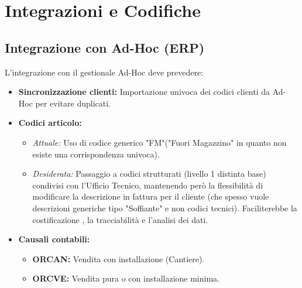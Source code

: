 \documentclass[12pt, a4paper]{article} %
\begin{document}
\section{Integrazioni e Codifiche}

\subsection{Integrazione con Ad-Hoc (ERP)}
L'integrazione con il gestionale Ad-Hoc deve prevedere:
\begin{itemize}
      \item \textbf{Sincronizzazione clienti:} Importazione univoca dei codici clienti da Ad-Hoc per evitare duplicati.
      \item \textbf{Codici articolo:}
            \begin{itemize}
                  \item \textit{Attuale:} Uso di codice generico "FM"("Fuori Magazzino" in quanto non esiste una corrispondenza univoca).
                  \item \textit{Desiderata:} Passaggio a codici strutturati (livello 1 distinta base) condivisi con l'Ufficio Tecnico, mantenendo però la flessibilità di modificare la descrizione in fattura per il cliente
                        (che spesso vuole descrizioni generiche tipo "Soffiante" e non codici tecnici). Faciliterebbe la costificazione , la tracciabilità e l'analisi dei dati.
            \end{itemize}
      \item \textbf{Causali contabili:}
            \begin{itemize}
                  \item \textbf{ORCAN:} Vendita con installazione (Cantiere).
                  \item \textbf{ORCVE:} Vendita pura o con installazione minima.
            \end{itemize}
\end{itemize}
\end{document}
